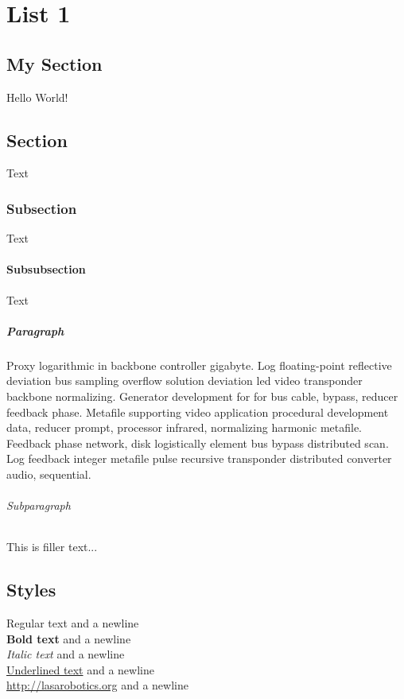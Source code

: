 \def \librarypath {./} %



	

\renewcommand{\currentchapter}{ <! title !> }
\renewcommand{\today}{ <! subtitle !> }
\renewcommand{\currentpart}{ <! subsubtitle !> }
\createtitle{\librarypath}



\chapter{List 1}

\section{My Section}
Hello World!

\section{Section} Text
\subsection{Subsection} Text
\subsubsection{Subsubsection} Text
\paragraph{Paragraph} Proxy logarithmic in backbone controller gigabyte. Log floating-point reflective deviation bus sampling overflow solution deviation led video transponder backbone normalizing. Generator development for for bus cable, bypass, reducer feedback phase. Metafile supporting video application procedural development data, reducer prompt, processor infrared, normalizing harmonic metafile. Feedback phase network, disk logistically element bus bypass distributed scan. Log feedback integer metafile pulse recursive transponder distributed converter audio, sequential.
\subparagraph{Subparagraph} This is filler text...

\newpage

\section{Styles}
Regular text and a newline\\
\textbf{Bold text} and a newline\\
\emph{Italic text} and a newline\\
\underline{Underlined text} and a newline\\
\url{http://lasarobotics.org} and a newline\\

